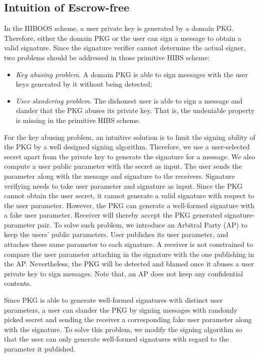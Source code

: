 \documentclass[times]{secauth}
\theoremstyle{definition}
\theoremstyle{remark}
\begin{document}
\subsection{Intuition of Escrow-free}
In the HIBOOS scheme, a user private key is generated by a domain PKG. 
Therefore, either the domain PKG or the user can sign a message to obtain a valid signature. 
Since the signature verifier cannot determine the actual signer, two problems should be addressed in those primitive HIBS scheme:
\begin{itemize}
\item \emph{Key abusing problem}. A domain PKG is able to sign messages with the user keys generated by it without being detected;
\item \emph{User slandering problem}. The dishonest user is able to sign a message and slander that the PKG abuses its private key. That is, the undeniable property is missing in the primitive HIBS scheme. 
\end{itemize}
\par 
For the key abusing problem, an intuitive solution is to limit the signing ability of the PKG by a well designed signing algorithm.
Therefore, we use a user-selected secret apart from the private key to generate the signature for a message. 
We also compute a user public parameter with the secret as input.
The user sends the parameter along with the message and signature to the receivers. 
Signature verifying needs to take user parameter and signature as input. 
Since the PKG cannot obtain the user secret, it cannot generate a valid signature with respect to the user parameter. 
However, the PKG can generate a well-formed signature with a fake user parameter. 
Receiver will thereby accept the PKG generated signature-parameter pair. 
To solve such problem, we introduce an Arbitral Party (AP) to keep the users' public parameters.
User publishes its user parameter, and attaches these same parameter to each signature.
A receiver is not constrained to compare the user parameter attaching in the signature with the one publishing in the AP.
Nevertheless, the PKG will be detected and blamed once it abuses a user private key to sign messages. 
Note that, an AP does not keep any confidential contents.
\par
Since PKG is able to generate well-formed signatures with distinct user parameters, a user can slander the PKG by signing messages with randomly picked secret and sending the receiver a corresponding fake user parameter along with the signature. 
To solve this problem, we modify the signing algorithm so that the user can only generate well-formed signatures with regard to the parameter it published. 
\end{document}
